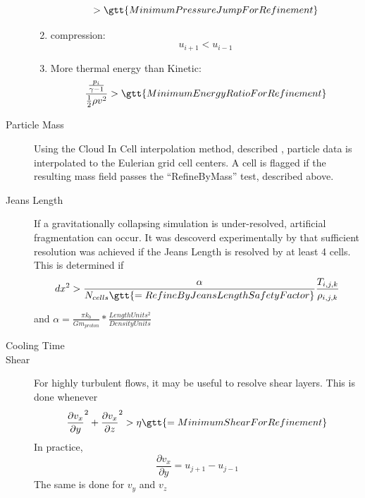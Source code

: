 \begin{description}
\begin{enumerate}
$$      > \gtt{MinimumPressureJumpForRefinement} $$
     \item compression: $$ u_{i+1} < u_{i-1} $$
    \item More thermal energy than Kinetic: $$ \frac{
    \frac{p_i}{\gamma -1} }{ \frac{1}{2}\rho v^2 } > \gtt{
    MinimumEnergyRatioForRefinement } $$ 
  \end{enumerate}  
  \item[Particle Mass] Using the Cloud In Cell interpolation method,
  described  , particle data is interpolated to the
  Eulerian grid cell centers.  A cell is flagged if the resulting mass field passes
  the ``RefineByMass'' test, described above.
  \item[Jeans Length] If a gravitationally collapsing simulation is
  under-resolved, artificial fragmentation can occur.  It was
  descoverd experimentally by 
  that sufficient resolution was achieved if the Jeans Length is
  resolved by at least 4 cells.  This is determined if 
  $$ dx^2 >
  \frac{\alpha}{N_{cells} \gtt{= RefineByJeansLengthSafetyFactor}}\frac{T_{i,j,k}}{\rho_{i,j,k}} $$
  
  and $\alpha = \frac{\pi k_b }{G m_{proton} }*
  \frac{LengthUnits^2}{DensityUnits}$

  \item[Cooling Time]  

  \item[Shear] For highly turbulent flows, it may be useful to resolve
  shear layers.  This is done whenever
  $$\frac{\partial v_x}{\partial y}^2 + \frac{\partial v_x}{\partial z}^2 
  > \eta \gtt{= MinimumShearForRefinement}
  $$
  In practice, $$\frac{\partial v_x}{\partial y} = 
  u_{j+1}-u_{j-1}$$
  The same is done for $v_y$ and $v_z$
  
\end{description}

